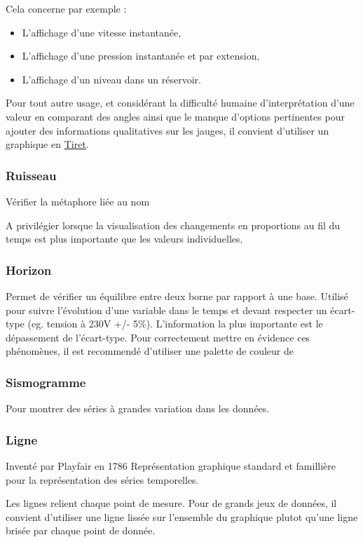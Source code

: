 \documentclass[a4paper,12pt]{article}
\begin{document}
\begin{multicols}{2}
Cela concerne par exemple :
\begin{itemize}
\item L'affichage d'une vitesse instantanée,
\item L'affichage d'une pression instantanée et par extension,
\item L'affichage d'un niveau dans un réservoir.
\end{itemize}

Pour tout autre usage, et considérant la difficulté humaine d'interprétation d'une valeur en comparant des angles ainsi que le manque d'options pertinentes pour ajouter des informations qualitatives sur les jauges, il convient d'utiliser un graphique en \hyperref[sec:org76bd7e9]{Tiret}.
\subsubsection*{Ruisseau}
\label{sec:org8cb4966}
Vérifier la métaphore liée au nom

A privilégier lorsque la visualisation des changements en proportions au fil du temps est plus importante que les valeurs individuelles. \autocite{alansmithLexiqueVisuel}
\subsubsection*{Horizon}
\label{sec:orgeaff874}
Permet de vérifier un équilibre entre deux borne par rapport à une base. \autocite{alansmithLexiqueVisuel}  Utilisé pour suivre l'évolution d'une variable dans le temps et devant respecter un écart-type (eg. tension à 230V +/- 5\%). L'information la plus importante est le dépassement de l'écart-type. Pour correctement mettre en évidence ces phénomènes, il est recommendé d'utiliser une palette de couleur de
\subsubsection*{Sismogramme}
\label{sec:org2be7578}
Pour montrer des séries à grandes variation dans les données. \autocite{alansmithLexiqueVisuel}
\subsubsection*{Ligne}
\label{sec:org221d3df}
Inventé par Playfair en 1786 \autocite{sosulskiBecomingVisual2019}
Représentation graphique standard et famillière pour la représentation des séries temporelles. \autocite[,@Schwabish2021p86]{alansmithLexiqueVisuel}

Les lignes relient chaque point de mesure. Pour de grands jeux de données, il convient d'utiliser une ligne lissée sur l'ensemble du graphique plutot qu'une ligne brisée par chaque point de donnée. \autocite{wilkeDirectoryVisualizations2019}


\end{multicols}
\end{document}
